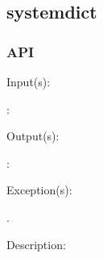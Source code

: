 %
%
%
%
%              

\subsection{systemdict}
\label{systemdict}

\subsubsection{API}
\begin{capi}
\label{systemdict_}
	\begin{capilist}
	\item[Input(s): ]
		\begin{description}\item[]
		\item[: ]
		\end{description}
	\item[Output(s): ]
		\begin{description}\item[]
		\item[: ]
		\end{description}
	\item[Exception(s): ]
		\begin{description}\item[]
		\item[.]
		\end{description}
	\item[Description: ]
	\end{capilist}
\end{capi}
